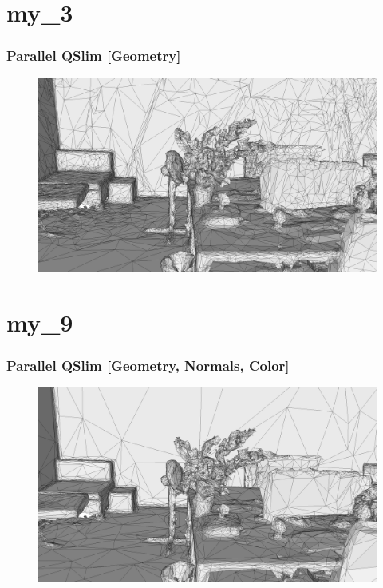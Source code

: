 \documentclass[
	10pt,
	t		%
]{beamer}
\begin{document}
\section{my_3}
\begin{frame}
\frametitle{Parallel QSlim [Geometry]}
\begin{figure}[ht]
\centering
\includegraphics[width=1\textwidth]{my_3}
\end{figure}
\end{frame}

\section{my_9}
\begin{frame}
\frametitle{Parallel QSlim [Geometry, Normals, Color]}
\begin{figure}[ht]
\centering
\includegraphics[width=1\textwidth]{my_9}
\end{figure}
\end{frame}
\end{document}
